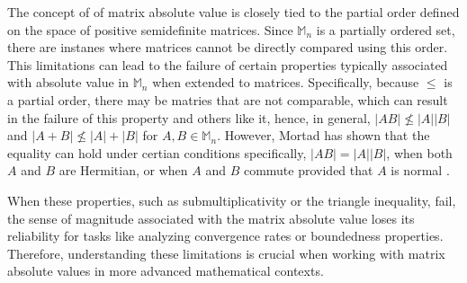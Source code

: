 \par The concept of of matrix absolute value is closely tied to the partial order defined on the space of positive semidefinite matrices. Since \(\mathbb{M}_n\) is a partially ordered set, there are instanes where matrices cannot be
directly compared using this order. This limitations can lead to the failure of certain properties typically associated with absolute value in \(\mathbb{M}_n\) when extended to matrices. Specifically, because \(\leq\) 
is a partial order, there may be matries that are not comparable, which can result in the failure of this property and others like it, hence, in general, \(|AB| \nleq |A||B|\) and \(|A+B| \nleq |A| + |B|\)
for \(A, B \in \mathbb{M}_n\). However, Mortad has shown that the equality can hold under certian conditions specifically, \(|AB| = |A||B|\), when both \(A\) and \(B\) are Hermitian, or when \(A\) and \(B\) commute provided that \(A\) is normal \cite{Mortad}.
\par When these properties, such as submultiplicativity or the triangle inequality, fail, the sense of magnitude associated with the matrix absolute value loses its reliability for tasks like analyzing convergence rates or boundedness properties. Therefore, understanding these limitations is crucial when working with matrix absolute values in more advanced mathematical contexts.